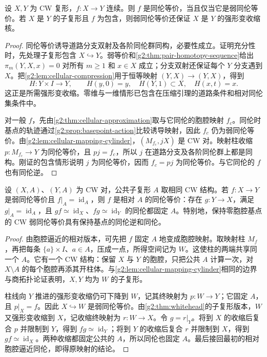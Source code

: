 \begin{theorem}[Whitehead]\label{g2:thm:whitehead}
	设 \(X,Y\) 为 CW 复形，\(f:X\rightarrow Y\) 连续。则 \(f\) 是同伦等价，当且仅当它是弱同伦等价。若 \(X\) 是 \(Y\) 的子复形且 \(f\) 为包含，则弱同伦等价还保证 \(X\) 是 \(Y\) 的强形变收缩核。
\end{theorem}
\begin{proof}
	同伦等价诱导道路分支双射及各阶同伦群同构，必要性成立。证明充分性时，先处理子复形包含 \(X\hookrightarrow Y\)。弱等价和\cref{g2:thm:pair-homotopy-sequence}给出 \(\pi_m(Y,X,x)=0\) 对所有 \(m\ge1\) 和 \(x\in X\) 成立；分支双射还保证每个 \(Y\) 分支遇到 \(X\)。把\cref{g2:lem:cellular-compression}用于恒等映射 \((Y,X)\rightarrow(Y,X)\)，得到
	\[
		H:Y\times I\longrightarrow Y,\qquad
		H(y,0)=y,\quad H(Y,1)\subset X,\quad H(x,t)=x.
	\]
	这正是所需强形变收缩。零维与一维情形已包含在压缩引理的道路条件和相对同伦集条件中。

	对一般 \(f\)，先由\cref{g2:thm:cellular-approximation}取与它同伦的胞腔映射 \(f_c\)。同伦时基点的轨迹通过\cref{g2:prop:basepoint-action}比较诱导映射，因此 \(f_c\) 仍为弱同伦等价。由\cref{g2:lem:cellular-mapping-cylinder}，\((M_{f_c},jX)\) 是 CW 对。映射柱收缩 \(p:M_{f_c}\rightarrow Y\) 为同伦等价，且 \(pj=f_c\)，所以 \(j\) 在道路分支及各阶同伦群上都是同构。刚证的包含情形说明 \(j\) 为同伦等价，因而 \(f_c=pj\) 为同伦等价。与它同伦的 \(f\) 也有同伦逆。
\end{proof}

\begin{corollary}[相对 Whitehead 判据]\label{g2:cor:relative-whitehead}
	设 \((X,A)\)、\((Y,A)\) 为 CW 对，公共子复形 \(A\) 取相同 CW 结构。若 \(f:X\rightarrow Y\) 是弱同伦等价且 \(f|_A=\operatorname{id}_A\)，则 \(f\) 是相对 \(A\) 的同伦等价：存在 \(g:Y\rightarrow X\)，满足 \(g|_A=\operatorname{id}_A\)，且 \(gf\simeq\operatorname{id}_X\)、\(fg\simeq\operatorname{id}_Y\) 的同伦都固定 \(A\)。特别地，保持零胞腔基点的 CW 弱同伦等价具有保持基点的同伦逆和同伦。
\end{corollary}
\begin{proof}
	由胞腔逼近的相对版本，可先把 \(f\) 固定 \(A\) 地变成胞腔映射。取映射柱 \(M_f\)，再把每条 \(\{a\}\times I\)、\(a\in A\)，压成一点，所得空间记为 \(W\)。这使柱的两端共享同一个 \(A\)。它有一个 CW 结构：保留 \(X\) 与 \(Y\) 的胞腔，只把公共 \(A\) 计算一次，对 \(X\setminus A\) 的每个胞腔再添其开柱体。与\cref{g2:lem:cellular-mapping-cylinder}相同的边界与商拓扑论证表明，\(X,Y\) 均为 \(W\) 的子复形。

	柱线向 \(Y\) 推进的强形变收缩仍可下降到 \(W\)，记其终映射为 \(p:W\rightarrow Y\)；它固定 \(A\)，且 \(p|_X=f\)。因此 \(X\hookrightarrow W\) 是弱同伦等价。由\cref{g2:thm:whitehead}的子复形版本，\(W\) 又强形变收缩到 \(X\)，记收缩终映射为 \(r:W\rightarrow X\)。令 \(g=r|_Y\)。将到 \(X\) 的收缩后复合 \(p\) 并限制到 \(Y\)，得到 \(fg\simeq\operatorname{id}_Y\)；将到 \(Y\) 的收缩后复合 \(r\) 并限制到 \(X\)，得到 \(gf\simeq\operatorname{id}_X\)。两种收缩都固定公共的 \(A\)，所以同伦也固定 \(A\)。最后接回最初的相对胞腔逼近同伦，即得原映射的结论。
\end{proof}

